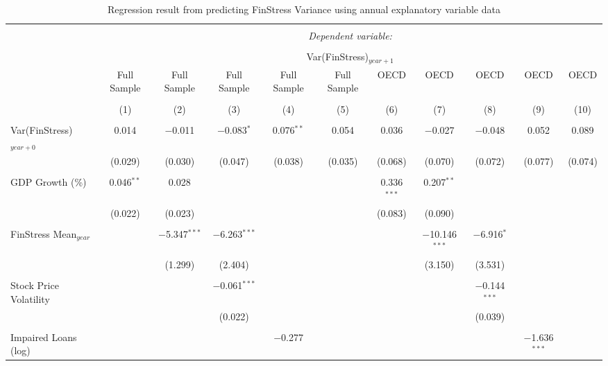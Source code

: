 
\begin{table}[!htbp] \centering 
  \caption{Regression result from predicting FinStress Variance using annual explanatory variable data} 
  \label{annual_reg} 
\tiny 
\begin{tabular}{@{\extracolsep{5pt}}lcccccccccc} 
\\[-1.8ex]\hline 
\hline \\[-1.8ex] 
 & \multicolumn{10}{c}{\textit{Dependent variable:}} \\ 
\cline{2-11} 
\\[-1.8ex] & \multicolumn{10}{c}{Var(FinStress)$_{year+1}$} \\ 
 & Full Sample & Full Sample & Full Sample & Full Sample & Full Sample & OECD & OECD & OECD & OECD & OECD \\ 
\\[-1.8ex] & (1) & (2) & (3) & (4) & (5) & (6) & (7) & (8) & (9) & (10)\\ 
\hline \\[-1.8ex] 
 Var(FinStress)$_{year+0}$ & 0.014 & $-$0.011 & $-$0.083$^{*}$ & 0.076$^{**}$ & 0.054 & 0.036 & $-$0.027 & $-$0.048 & 0.052 & 0.089 \\ 
  & (0.029) & (0.030) & (0.047) & (0.038) & (0.035) & (0.068) & (0.070) & (0.072) & (0.077) & (0.074) \\ 
  & & & & & & & & & & \\ 
 GDP Growth (\%) & 0.046$^{**}$ & 0.028 &  &  &  & 0.336$^{***}$ & 0.207$^{**}$ &  &  &  \\ 
  & (0.022) & (0.023) &  &  &  & (0.083) & (0.090) &  &  &  \\ 
  & & & & & & & & & & \\ 
 FinStress Mean$_{year}$ &  & $-$5.347$^{***}$ & $-$6.263$^{***}$ &  &  &  & $-$10.146$^{***}$ & $-$6.916$^{*}$ &  &  \\ 
  &  & (1.299) & (2.404) &  &  &  & (3.150) & (3.531) &  &  \\ 
  & & & & & & & & & & \\ 
 Stock Price Volatility &  &  & $-$0.061$^{***}$ &  &  &  &  & $-$0.144$^{***}$ &  &  \\ 
  &  &  & (0.022) &  &  &  &  & (0.039) &  &  \\ 
  & & & & & & & & & & \\ 
 Impaired Loans (log) &  &  &  & $-$0.277 &  &  &  &  & $-$1.636$^{***}$ &  \\ 

\end{tabular}
\end{table}
